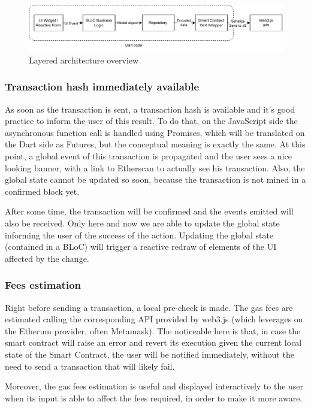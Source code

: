 \documentclass[main.tex]{subfiles}
\begin{document}
\begin{figure}[htbp]
    \centering
    \includegraphics[width=\textwidth]{figures/dart_invocations_dataflow.pdf}
    \caption{Layered architecture overview}
    \label{fig:dart_invocations_dataflow}
\end{figure}

\subsubsection{Transaction hash immediately available}
As soon as the transaction is sent, a transaction hash is available and it's good practice to inform the user of this result.
To do that, on the JavaScript side the asynchronous function call is handled using Promises, which will be translated on the Dart side as Futures, but the conceptual meaning is exactly the same.
At this point, a global event of this transaction is propagated and the user sees a nice looking banner, with a link to Etherscan to actually see his transaction. Also, the global state cannot be updated so soon, because the transaction is not mined in a confirmed block yet.

After some time, the transaction will be confirmed and the events emitted will also be received.
Only here and now we are able to update the global state informing the user of the success of the action. Updating the global state (contained in a BLoC) will trigger a reactive redraw of elements of the UI affected by the change.

\subsubsection{Fees estimation}
Right before sending a transaction, a local pre-check is made. The gas fees are estimated calling the corresponding API provided by web3.js (which leverages on the Etherum provider, often Metamask).
The noticeable here is that, in case the smart contract will raise an error and revert its execution given the current local state of the Smart Contract, the user will be notified immediately, without the need to send a transaction that will likely fail.

Moreover, the gas fees estimation is useful and displayed interactively to the user when its input is able to affect the fees required, in order to make it more aware.
\end{document}
